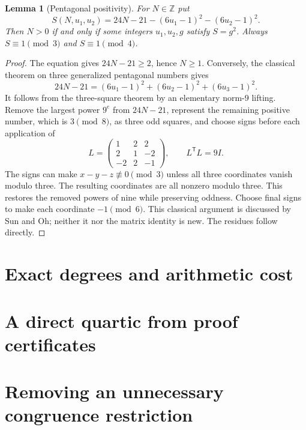 \documentclass[11pt]{article}
\newtheorem{lemma}[theorem]{Lemma}
\theoremstyle{remark}\newtheorem{remark}[theorem]{Remark}
\newcommand{\Z}{\mathbb Z}\newcommand{\N}{\mathbb N}\newcommand{\Q}{\mathbb Q}
\begin{document}
\begin{lemma}[Pentagonal positivity]\label{lem:positive}
For $N\in\Z$ put
\[
 S(N,u_1,u_2)=24N-21-(6u_1-1)^2-(6u_2-1)^2.
\]
Then $N>0$ if and only if some integers $u_1,u_2,g$ satisfy $S=g^2$.
Always $S\equiv1\pmod3$ and $S\equiv1\pmod4$.
\end{lemma}
\begin{proof}
The equation gives $24N-21\ge2$, hence $N\ge1$. Conversely, the
classical theorem on three generalized pentagonal numbers gives
\[
 24N-21=(6u_1-1)^2+(6u_2-1)^2+(6u_3-1)^2.
\]
It follows from the three-square theorem by an elementary norm-$9$
lifting. Remove the largest power $9^e$ from $24N-21$, represent the
remaining positive number, which is $3\pmod8$, as three odd squares,
and choose signs before each application of
\[
 L=\begin{pmatrix}1&2&2\\2&1&-2\\-2&2&-1\end{pmatrix},
 \qquad L^{\mathsf T}L=9I.
\]
The signs can make $x-y-z\not\equiv0\pmod3$ unless all three
coordinates vanish modulo three. The resulting coordinates are all
nonzero modulo three. This restores the removed powers of nine while
preserving oddness. Choose final signs to make each coordinate $-1\pmod6$.
This classical argument is discussed by Sun and Oh; neither it nor the
matrix identity is new\cite{sunpent,oh}. The residues follow directly.
\end{proof}


\section{Exact degrees and arithmetic cost}\label{sec:degrees}

\section{A direct quartic from proof certificates}\label{sec:direct}

\section{Removing an unnecessary congruence restriction}\label{sec:freej}



\appendix
\end{document}
